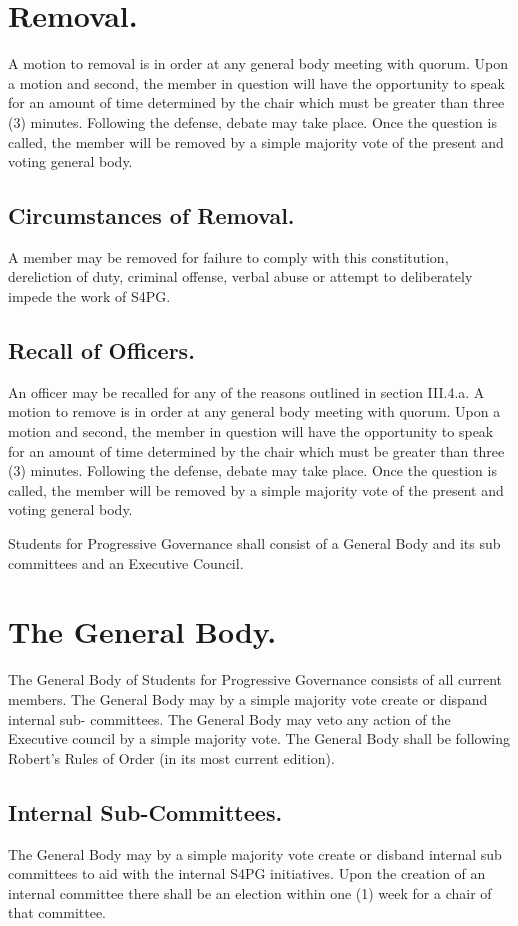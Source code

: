 \documentclass[12pt,letterpaper]{constitution}
\begin{document}
\section{Removal.}
A motion to removal is in order at any general body meeting with quorum. Upon a motion and second, the member in question will have the opportunity to speak for an amount of time determined by the chair which must be greater than three (3) minutes.  Following the defense, debate may take place.  Once the question is called, the member will be removed by a simple majority vote of the present and voting general body.

\subsection{Circumstances of Removal.}
A member may be removed for failure to comply with this constitution, dereliction of duty, criminal offense, verbal abuse or attempt to deliberately impede the work of S4PG.

\subsection{Recall of Officers.}
An officer may be recalled for any of the reasons outlined in section III.4.a. A motion to remove is in order at any general body meeting with quorum. Upon a motion and second, the member in question will have the opportunity to speak for an amount of time determined by the chair which must be greater than three (3) minutes.  Following the defense, debate may take place.  Once the question is called, the member will be removed by a simple majority  vote of the present and voting general body.


Students for Progressive Governance shall consist of a General Body and its sub committees and an Executive Council.

\section{The General Body.}
The General Body of Students for Progressive Governance consists of all current members.  The General Body may by a simple majority vote create or dispand internal sub- committees.  The General Body may veto any action of the Executive council by a simple majority vote. The General Body shall be following Robert’s Rules of Order (in its most current edition).  

\subsection{Internal Sub-Committees.}
The General Body may by a simple majority vote create or disband internal sub committees to aid with the internal S4PG initiatives.  Upon the creation of an internal committee there shall be an election within one (1) week for a chair of that committee.
\end{document}
